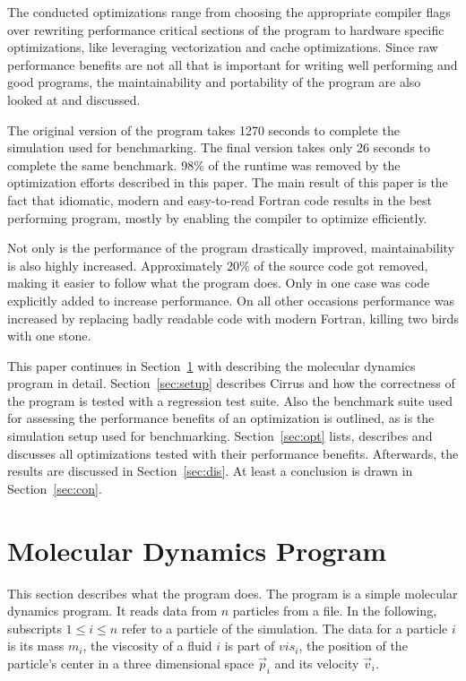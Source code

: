 \documentclass[twoside,11pt]{article}
\begin{document}
The conducted optimizations range from choosing the appropriate
compiler flags over rewriting performance critical sections of the
program to hardware specific optimizations, like leveraging
vectorization and cache optimizations.
Since raw performance benefits are not all that is important for
writing well performing and good programs, the maintainability and
portability of the program are also looked at and discussed.

The original version of the program takes 1270 seconds to complete the
simulation used for benchmarking.
The final version takes only 26 seconds to complete the same
benchmark.
98\% of the runtime was removed by the optimization efforts described
in this paper.
The main result of this paper is the fact that idiomatic, modern and
easy-to-read Fortran code results in the best performing program,
mostly by enabling the compiler to optimize efficiently.

Not only is the performance of the program drastically improved,
maintainability is also highly increased.
Approximately 20\% of the source code got removed, making it easier
to follow what the program does.
Only in one case was code explicitly added to increase performance.
On all other occasions performance was increased by replacing badly
readable code with modern Fortran, killing two birds with one stone.

This paper continues in Section~\ref{sec:md} with describing the
molecular dynamics program in detail.
Section~\ref{sec:setup} describes Cirrus and how the correctness of
the program is tested with a regression test suite.
Also the benchmark suite used for assessing the performance benefits
of an optimization is outlined, as is the simulation setup used for
benchmarking.
Section~\ref{sec:opt} lists, describes and discusses all
optimizations tested with their performance benefits.
Afterwards, the results are discussed in Section~\ref{sec:dis}.
At least a conclusion is drawn in Section~\ref{sec:con}.


\section{Molecular Dynamics Program} %
\label{sec:md}

This section describes what the program does.
The program is a simple molecular dynamics program.
It reads data from $n$ particles from a file.
In the following, subscripts $1 \leq i \leq n$ refer to a particle
of the simulation.
The data for a particle $i$ is its mass $m_i$, the viscosity of
a fluid $i$ is part of $vis_i$, the position of the particle's center
in a three dimensional space $\vec{p}_i$ and its velocity $\vec{v}_i$.
\end{document}
